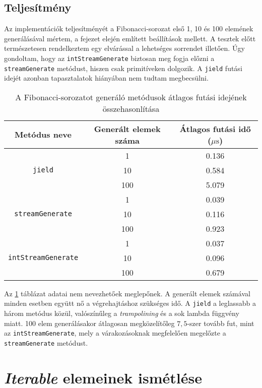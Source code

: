 \subsection{Teljesítmény}

Az implementációk teljesítményét a Fibonacci-sorozat első 1, 10 és 100 elemének generálásával mértem, a fejezet elején említett beállítások mellett. A tesztek előtt természetesen rendelkeztem egy elvárással a lehetséges sorrendet illetően. Úgy gondoltam, hogy az \texttt{intStreamGenerate} biztosan meg fogja előzni a \texttt{streamGenerate} metódust, hiszen csak primitíveken dolgozik. A \texttt{jield} futási idejét azonban tapasztalatok hiányában nem tudtam megbecsülni.

\begin{table}[h]
\captionsetup{justification=centering}
\centering
  \begin{tabular}{|| c | c | c ||}
  \hline
  Metódus neve & Generált elemek száma & Átlagos futási idő ($\mu\mathrm{s}$) \\
  \hline \hline
  \multirow{3}{8.8em}{\texttt{jield}} & 1 & 0.136 \\
  & 10 & 0.584 \\
  & 100 & 5.079 \\
  \hline
  \multirow{3}{8.8em}{\texttt{streamGenerate}} & 1 & 0.039 \\
  & 10 & 0.116 \\
  & 100 & 0.923 \\
  \hline
  \multirow{3}{8.8em}{\texttt{intStreamGenerate}} & 1 & 0.037 \\
  & 10 & 0.096 \\
  & 100 & 0.679 \\
  \hline
  \end{tabular}
\caption{A Fibonacci-sorozatot generáló metódusok átlagos futási idejének összehasonlítása}  
\label{table:fibComp}
\end{table}

Az \ref{table:fibComp} táblázat adatai nem nevezhetőek meglepőnek. A generált elemek számával minden esetben együtt nő a végrehajtáshoz szükséges idő. A \texttt{jield} a leglassabb a három metódus közül, valószínűleg a \textit{trampolining} és a sok lambda függvény miatt. 100 elem generálásakor átlagosan megközelítőleg $7,5$-szer tovább fut, mint az \texttt{intStreamGenerate}, mely a várakozásoknak megfelelően megelőzte a \texttt{streamGenerate} metódust.

\section{\textit{Iterable} elemeinek ismétlése}

